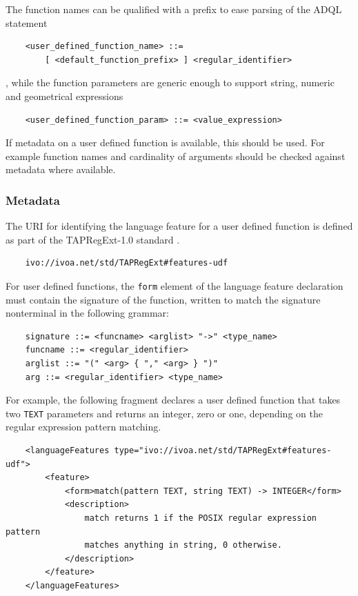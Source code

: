 \documentclass[11pt,a4paper]{ivoa}
\begin{document}
The function names can be qualified with a prefix to ease parsing of the
ADQL statement

\begin{verbatim}
    <user_defined_function_name> ::=
        [ <default_function_prefix> ] <regular_identifier>
\end{verbatim}

, while the function parameters are generic enough to support string,
numeric and geometrical expressions

\begin{verbatim}
    <user_defined_function_param> ::= <value_expression>
\end{verbatim}

If metadata on a user defined function is available, this should be used. For
example function names and cardinality of arguments should be checked against
metadata where available.

\subsubsection{Metadata}
\label{sec:user.metadata}

The URI for identifying the language feature for a user defined function
is defined as part of the TAPRegExt-1.0 standard \citep{std:TAPREGEXT}.

\begin{verbatim}
    ivo://ivoa.net/std/TAPRegExt#features-udf
\end{verbatim}

For user defined functions, the \verb:form: element of the language feature
declaration must contain the signature of the function, written to match
the signature nonterminal in the following grammar:

\begin{verbatim}
    signature ::= <funcname> <arglist> "->" <type_name>
    funcname ::= <regular_identifier>
    arglist ::= "(" <arg> { "," <arg> } ")"
    arg ::= <regular_identifier> <type_name>
\end{verbatim}

For example, the following fragment declares a user defined function that
takes two \verb:TEXT: parameters and returns an integer, zero or one,
depending on the regular expression pattern matching.

\begin{verbatim}
    <languageFeatures type="ivo://ivoa.net/std/TAPRegExt#features-udf">
        <feature>
            <form>match(pattern TEXT, string TEXT) -> INTEGER</form>
            <description>
                match returns 1 if the POSIX regular expression pattern
                matches anything in string, 0 otherwise.
            </description>
        </feature>
    </languageFeatures>
\end{verbatim}
\end{document}
